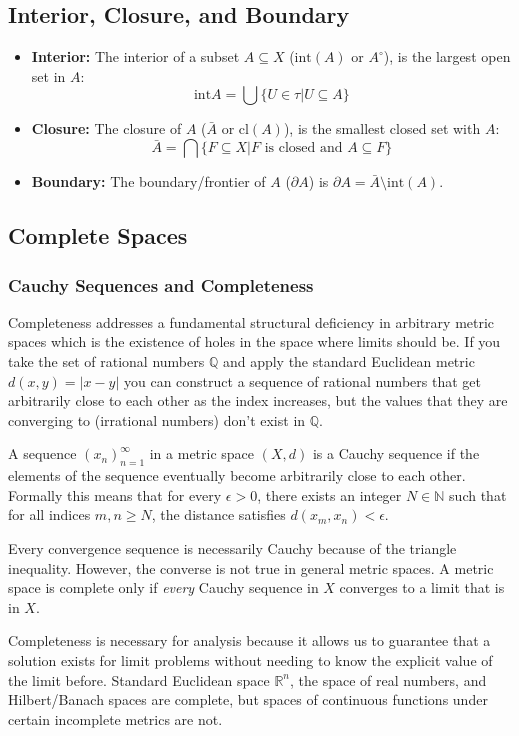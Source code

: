\documentclass[10pt,a4paper]{article}
\begin{document}
		\subsection{Interior, Closure, and Boundary}
		\begin{itemize}
			\item \textbf{Interior:} The interior of a subset $A\subseteq X$ ($\text{int}(A)$ or $A^\circ$), is the largest open set in $A$: $$\text{int}A=\bigcup \{ U\in\tau \vert U\subseteq A \}$$
			\item \textbf{Closure:} The closure of $A$ ($\bar{A}$ or $\text{cl}(A)$), is the smallest closed set with $A$: $$\bar{A}=\bigcap\{ F\subseteq X \vert F \text{ is closed and } A\subseteq F \}$$
			\item \textbf{Boundary:} The boundary/frontier of $A$ ($\partial A$) is $\partial A=\bar{A}\setminus\text{int}(A)$.
		\end{itemize}
		\subsection{Complete Spaces}
			\subsubsection{Cauchy Sequences and Completeness}
			Completeness addresses a fundamental structural deficiency in arbitrary metric spaces which is the existence of holes in the space where limits should be. If you take the set of rational numbers $\mathbb{Q}$ and apply the standard Euclidean metric $d(x,y)=|x-y|$ you can construct a sequence of rational numbers that get arbitrarily close to each other as the index increases, but the values that they are converging to (irrational numbers) don't exist in $\mathbb{Q}$.
			
			A sequence $(x_n)_{n=1}^{\infty}$ in a metric space $(X, d)$ is a Cauchy sequence if the elements of the sequence eventually become arbitrarily close to each other. Formally this means that for every $\epsilon > 0$, there exists an integer $N\in\mathbb{N}$ such that for all indices $m,n\geq N$, the distance satisfies $d(x_m,x_n) <\epsilon$.
			
			Every convergence sequence is necessarily Cauchy because of the triangle inequality. However, the converse is not true in general metric spaces. A metric space is complete only if \textit{every} Cauchy sequence in $X$ converges to a limit that is in $X$.
			
			Completeness is necessary for analysis because it allows us to guarantee that a solution exists for limit problems without needing to know the explicit value of the limit before. Standard Euclidean space $\mathbb{R}^n$, the space of real numbers, and Hilbert/Banach spaces are complete, but spaces of continuous functions under certain incomplete metrics are not.
\end{document}
